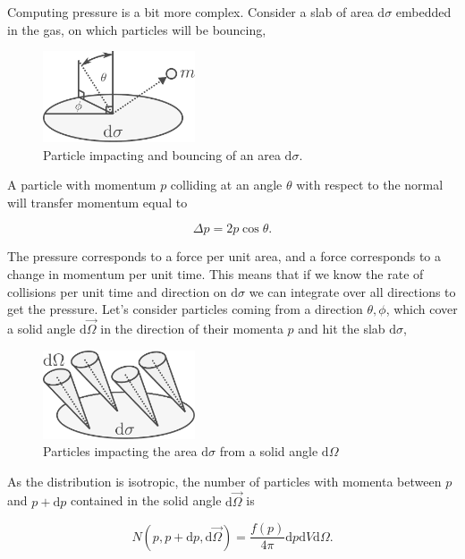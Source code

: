 \documentclass[twocolumn]{article}
\begin{document}
Computing pressure is a bit more complex. Consider a slab of area
\(\mathrm{d}\sigma\) embedded in the gas, on which particles will be
bouncing,

\begin{figure}
\centering
\includegraphics[width=0.4\textwidth]{../assets/4_eos2/pressure1.pdf}
\caption{Particle impacting and bouncing of an area
\(\mathrm{d}\sigma\).}
\end{figure}

A particle with momentum \(p\) colliding at an angle \(\theta\) with
respect to the normal will transfer momentum equal to

\[\Delta p = 2p\cos{\theta}. \tag{3.1}\]

The pressure corresponds to a force per unit area, and a force
corresponds to a change in momentum per unit time. This means that if we
know the rate of collisions per unit time and direction on
\(\mathrm{d}\sigma\) we can integrate over all directions to get the
pressure. Let's consider particles coming from a direction
\(\theta,\phi\), which cover a solid angle \(\mathrm{d}\vec{\Omega}\) in
the direction of their momenta \(p\) and hit the slab
\(\mathrm{d}\sigma\),

\begin{figure}
\centering
\includegraphics[width=0.4\textwidth]{../assets/4_eos2/pressure2.pdf}
\caption{Particles impacting the area \(\mathrm{d}\sigma\) from a solid
angle \(\mathrm{d}\Omega\)}
\end{figure}

As the distribution is isotropic, the number of particles with momenta
between \(p\) and \(p+\mathrm{d}p\) contained in the solid angle
\(\mathrm{d}\vec{\Omega}\) is

\[N(p,p+\mathrm{d}p,\mathrm{d}\vec{\Omega})=\frac{f(p)}{4\pi}\mathrm{d}p\mathrm{d}V\mathrm{d}\Omega.\]
\end{document}
